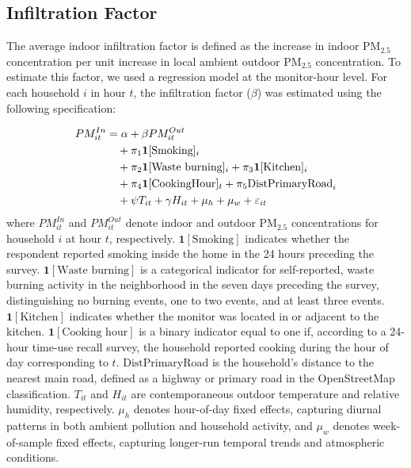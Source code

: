 \documentclass[9pt,twocolumn,twoside]{pnas-new}
\begin{document}
\subsection{Infiltration Factor}
The average indoor infiltration factor is defined as the increase in indoor PM$_{2.5}$ concentration per unit increase in local ambient outdoor PM$_{2.5}$ concentration. To estimate this factor, we used a regression model at the monitor-hour level. For each household $i$ in hour $t$, the infiltration factor ($\beta$) was estimated using the following specification:

\begin{align}
\label{eq:infiltration}
    PM^{In}_{it} &= \alpha + \beta PM^{Out}_{it}  \\
    &\quad + \pi_1 \mathbf{1}[\text{Smoking}]_i  \notag \\ &\quad+ \pi_2 \mathbf{1}[\text{Waste burning}]_i + \pi_3 \mathbf{1}[\text{Kitchen}]_i \notag \\ &\quad + \pi_4 \mathbf{1}[\text{CookingHour}]_t + \pi_5 \text{DistPrimaryRoad}_i \notag \\ &\quad+ \psi T_{it} + \gamma H_{it} + \mu_h + \mu_w + \varepsilon_{it} \notag
\end{align}
where $PM^{In}_{it}$ and $PM^{Out}_{it}$ denote indoor and outdoor PM$_{2.5}$ 
concentrations for household $i$ at hour $t$, respectively. 
$\mathbf{1}[\text{Smoking}]$ indicates whether the respondent reported smoking 
inside the home in the 24 hours preceding the survey. 
$\mathbf{1}[\text{Waste burning}]$ is a categorical indicator for self-reported, waste burning activity in the neighborhood in the seven days preceding the survey, 
distinguishing no burning events, one to two events, and at least three events. 
$\mathbf{1}[\text{Kitchen}]$ indicates whether the monitor was located in or  adjacent to the kitchen. 
$\mathbf{1}[\text{Cooking hour}]$ is a binary indicator equal to one if, according to a 24-hour time-use recall survey, the household reported cooking during the hour of day corresponding to $t$. 
$\text{DistPrimaryRoad}$ is the household's distance to the nearest main road, defined as a highway or primary road in the OpenStreetMap classification. 
$T_{it}$ and $H_{it}$ are contemporaneous outdoor temperature and relative 
humidity, respectively. 
$\mu_h$ denotes hour-of-day fixed effects, capturing diurnal patterns in both 
ambient pollution and household activity, and $\mu_w$ denotes week-of-sample  fixed effects, capturing longer-run temporal trends and atmospheric conditions.
\end{document}
